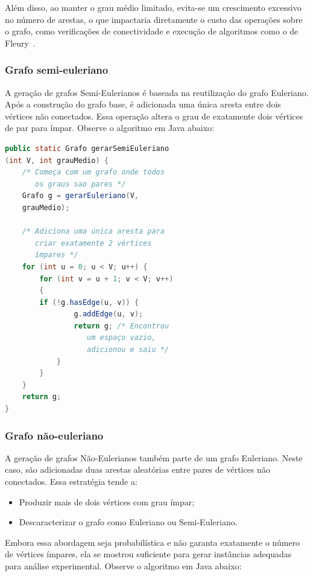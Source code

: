 \documentclass{sbc2023}%
\begin{document}
Além disso, ao manter o grau médio limitado, evita-se um crescimento excessivo no número de arestas, o que impactaria diretamente o custo das operações sobre o grafo, como verificações de conectividade e execução de algoritmos como o de Fleury~\citep{AlgoFleury}.

\subsubsection{Grafo semi-euleriano}

A geração de grafos Semi-Eulerianos é baseada na reutilização do grafo Euleriano. Após a construção do grafo base, é adicionada uma única aresta entre dois vértices não conectados. Essa operação altera o grau de exatamente dois vértices de par para ímpar. Observe o algoritmo em Java abaixo:

\begin{lstlisting}[language=Java, caption={Gerador de Grafo Semi-Euleriano}]
public static Grafo gerarSemiEuleriano
(int V, int grauMedio) {
    /* Começa com um grafo onde todos 
       os graus sao pares */
    Grafo g = gerarEuleriano(V, 
    grauMedio);

    /* Adiciona uma única aresta para 
       criar exatamente 2 vértices 
       ímpares */
    for (int u = 0; u < V; u++) {
        for (int v = u + 1; v < V; v++) 
        { 
        if (!g.hasEdge(u, v)) {
                g.addEdge(u, v);
                return g; /* Encontrou 
                   um espaço vazio, 
                   adicionou e saiu */
            }
        }
    }
    return g;
}
\end{lstlisting}

\subsubsection{Grafo não-euleriano}

A geração de grafos Não-Eulerianos também parte de um grafo Euleriano.
Neste caso, são adicionadas duas arestas aleatórias entre pares de vértices não conectados. Essa estratégia tende a:

    \begin{itemize}
        \item Produzir mais de dois vértices com grau ímpar;
        \item Descaracterizar o grafo como Euleriano ou Semi-Euleriano.
    \end{itemize}

Embora essa abordagem seja probabilística e não garanta exatamente o número de vértices ímpares, ela se mostrou suficiente para gerar instâncias adequadas para análise experimental. Observe o algoritmo em Java abaixo:
\end{document}
